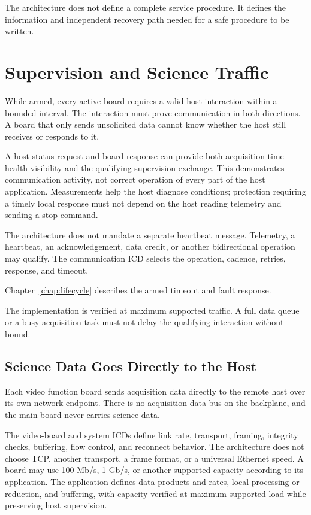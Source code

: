 The architecture does not define a complete service procedure. It defines the information and independent recovery path needed for a safe procedure to be written.

\section{Supervision and Science Traffic}

While armed, every active board requires a valid host interaction within a bounded interval. The interaction must prove communication in both directions. A board that only sends unsolicited data cannot know whether the host still receives or responds to it.

A host status request and board response can provide both acquisition-time health visibility and the qualifying supervision exchange. This demonstrates communication activity, not correct operation of every part of the host application. Measurements help the host diagnose conditions; protection requiring a timely local response must not depend on the host reading telemetry and sending a stop command.

The architecture does not mandate a separate heartbeat message. Telemetry, a heartbeat, an acknowledgement, data credit, or another bidirectional operation may qualify. The communication ICD selects the operation, cadence, retries, response, and timeout.

Chapter~\ref{chap:lifecycle} describes the armed timeout and fault response.

The implementation is verified at maximum supported traffic. A full data queue or a busy acquisition task must not delay the qualifying interaction without bound.

\subsection{Science Data Goes Directly to the Host}

Each video function board sends acquisition data directly to the remote host over its own network endpoint. There is no acquisition-data bus on the backplane, and the main board never carries science data.

The video-board and system ICDs define link rate, transport, framing, integrity checks, buffering, flow control, and reconnect behavior. The architecture does not choose TCP, another transport, a frame format, or a universal Ethernet speed. A board may use 100 Mb/s, 1 Gb/s, or another supported capacity according to its application. The application defines data products and rates, local processing or reduction, and buffering, with capacity verified at maximum supported load while preserving host supervision.

